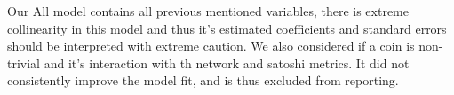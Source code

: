 Our All model contains all previous mentioned variables, there is extreme collinearity in this model and thus it's estimated coefficients and standard errors should be interpreted with extreme caution. 
We also considered if a coin is non-trivial and it's interaction with th network and satoshi metrics. It did not consistently improve the model fit, and is thus excluded from reporting. 











